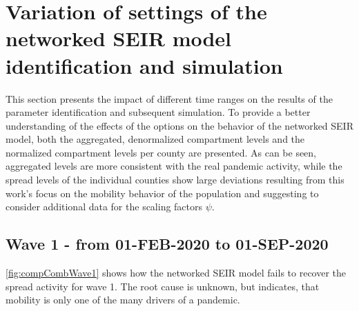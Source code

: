 \section{Variation of settings of the networked SEIR model identification and simulation}\label{sec:variationsOfSEIRSettings}
This section presents the impact of different time ranges on the results of the parameter identification and subsequent simulation. To provide a better understanding of the effects of the options on the behavior of the networked SEIR model, both the aggregated, denormalized compartment levels and the normalized compartment levels per county are presented. As can be seen, aggregated levels are more consistent with the real pandemic activity, while the spread levels of the individual counties show large deviations resulting from this work's focus on the mobility behavior of the population and suggesting to consider additional data for the scaling factors $\psi$.

\subsection{Wave 1 - from 01-FEB-2020 to 01-SEP-2020}

\autoref{fig:compCombWave1} shows how the networked SEIR model fails to recover the spread activity for wave 1. The root cause is unknown, but indicates, that mobility is only one of the many drivers of a pandemic.

